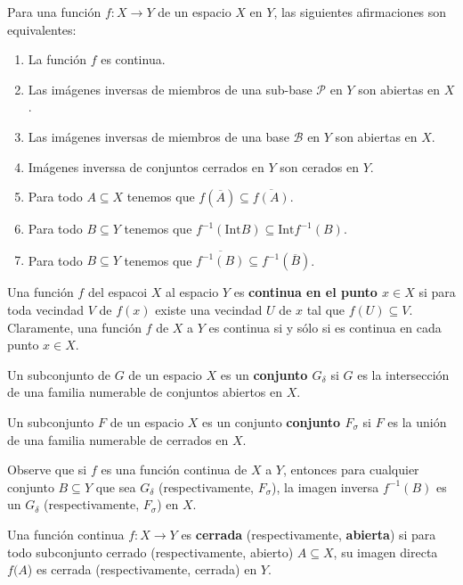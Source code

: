 \documentclass[12pt]{report}
\theoremstyle{largebreak}
\newcommand{\eul}[1]{\ensuremath{\mathscr{#1}}}
\newcommand{\Int}[1]{\text{Int}\ensuremath{#1}}
\newcommand{\cf}[3]{\ensuremath{#1:#2\rightarrow#3}}
\begin{document}
    \begin{propo}
        Para una función $\cf{f}{X}{Y}$ de un espacio $X$ en $Y$, las siguientes afirmaciones son equivalentes:
        \begin{enumerate}
            \item La función $f$ es continua.
            \item Las imágenes inversas de miembros de una sub-base $\eul{P}$ en $Y$ son abiertas en $X$.
            \item Las imágenes inversas de miembros de una base $\eul{B}$ en $Y$ son abiertas en $X$.
            \item Imágenes inverssa de conjuntos cerrados en $Y$ son cerados en $Y$.
            \item Para todo $A\subseteq X$ tenemos que $f(\overline{A})\subseteq\overline{f(A)}$.
            \item Para todo $B\subseteq Y$ tenemos que $f^{-1}(\Int{B})\subseteq\Int{f^{-1}(B)}$.
            \item Para todo $B\subseteq Y$ tenemos que $\overline{f^{-1}(B)}\subseteq f^{-1}(\overline{B})$.
        \end{enumerate}
    \end{propo}

    Una función $f$ del espacoi $X$ al espacio $Y$ es \textbf{continua en el punto $x\in X$} si para toda vecindad $V$ de $f(x)$ existe una vecindad $U$ de $x$ tal que $f(U)\subseteq V$. Claramente, una función $f$ de $X$ a $Y$ es continua si y sólo si es continua en cada punto $x\in X$.

    \begin{mydef}
        Un subconjunto de $G$ de un espacio $X$ es un \textbf{conjunto $G_\delta$} si $G$ es la intersección de una familia numerable de conjuntos abiertos en $X$.

        Un subconjunto $F$ de un espacio $X$ es un conjunto \textbf{conjunto $F_\sigma$} si $F$ es la unión de una familia numerable de cerrados en $X$.
    \end{mydef}

    \begin{obs}
        Observe que si $f$ es una función continua de $X$ a $Y$, entonces para cualquier conjunto $B\subseteq Y$ que sea $G_\delta$ (respectivamente, $F_\sigma$), la imagen inversa $f^{-1}(B)$ es un $G_\delta$ (respectivamente, $F_\sigma$) en $X$.
    \end{obs}

    \begin{mydef}
        Una función continua $\cf{f}{X}{Y}$ es \textbf{cerrada} (respectivamente, \textbf{abierta}) si para todo subconjunto cerrado (respectivamente, abierto) $A\subseteq X$, su imagen directa $f(A$) es cerrada (respectivamente, cerrada) en $Y$.
    \end{mydef}
\end{document}
